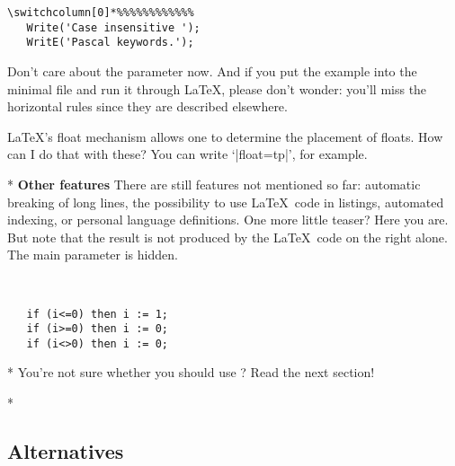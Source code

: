 \begin{paracol}{2}
\begin{lstsample}{\lstset{frame=tb}}{}
\begin{lstlisting}[float,caption=A floating example]
\switchcolumn[0]*%%%%%%%%%%%%
   Write('Case insensitive ');
   WritE('Pascal keywords.');
   \end{lstlisting}
\end{lstsample}
Don't care about the parameter  now. And if you put the
example into the minimal file and run it through \LaTeX, please don't wonder:
you'll miss the horizontal rules since they are described elsewhere.
\begin{advise}
\item \LaTeX's float mechanism allows one to determine the placement of floats.
      How can I do that with these?
      \advisespace
      You can write `|float=tp|', for example.
\end{advise}
\switchcolumn

\switchcolumn[0]*%
\textbf{Other features}
There are still features not mentioned so far: automatic breaking of long
lines, the possibility to use \LaTeX\ code in listings, automated indexing,
or personal language definitions.
One more little teaser? Here you are. But note that the result is not
produced by the \LaTeX\ code on the right alone. The main parameter is
hidden.
\begin{lstsample}{^^A
  }{}
   \begin{lstlisting}
   if (i<=0) then i := 1;
   if (i>=0) then i := 0;
   if (i<>0) then i := 0;
   \end{lstlisting}
\end{lstsample}
\switchcolumn

\switchcolumn[0]*%
You're not sure whether you should use ?
Read the next section!
\switchcolumn

\switchcolumn[0]*%
\subsection{Alternatives}
\switchcolumn


\end{paracol}
